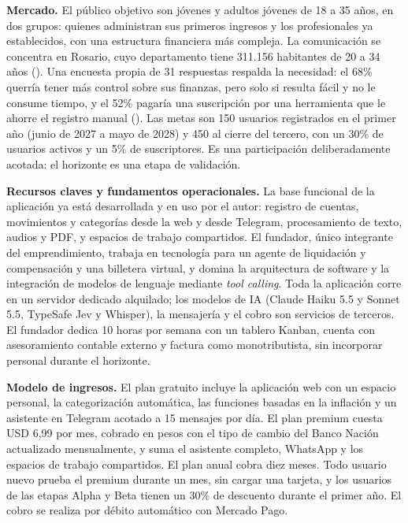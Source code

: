 \textbf{Mercado.} El público objetivo son jóvenes y adultos jóvenes de
18 a 35 años, en dos grupos: quienes administran sus primeros ingresos y
los profesionales ya establecidos, con una estructura financiera más
compleja. La comunicación se concentra en Rosario, cuyo departamento
tiene 311.156 habitantes de 20 a 34 años
(). Una encuesta propia de
31 respuestas respalda la necesidad: el 68\% querría tener más control
sobre sus finanzas, pero solo si resulta fácil y no le consume tiempo, y
el 52\% pagaría una suscripción por una herramienta que le ahorre el
registro manual ().
Las metas son 150 usuarios registrados en el primer año (junio de 2027 a
mayo de 2028) y 450 al cierre del tercero, con un 30\% de usuarios
activos y un 5\% de suscriptores. Es una participación deliberadamente
acotada: el horizonte es una etapa de validación.

\textbf{Recursos claves y fundamentos operacionales.} La base funcional
de la aplicación ya está desarrollada y en uso por el autor: registro de
cuentas, movimientos y categorías desde la web y desde Telegram,
procesamiento de texto, audios y PDF, y espacios de trabajo compartidos.
El fundador, único integrante del emprendimiento, trabaja en tecnología
para un agente de liquidación y compensación y una billetera virtual, y
domina la arquitectura de software y la integración de modelos de
lenguaje mediante \emph{tool calling}. Toda la aplicación corre en un
servidor dedicado alquilado; los modelos de IA (Claude Haiku 5.5 y
Sonnet 5.5, TypeSafe Jev y Whisper), la mensajería y el cobro son
servicios de terceros. El fundador dedica 10 horas por semana con un
tablero Kanban, cuenta con asesoramiento contable externo y factura como
monotributista, sin incorporar personal durante el horizonte.

\textbf{Modelo de ingresos.} El plan gratuito incluye la aplicación web
con un espacio personal, la categorización automática, las funciones
basadas en la inflación y un asistente en Telegram acotado a 15 mensajes
por día. El plan premium cuesta USD 6,99 por mes, cobrado en pesos con
el tipo de cambio del Banco Nación actualizado mensualmente, y suma el
asistente completo, WhatsApp y los espacios de trabajo compartidos. El
plan anual cobra diez meses. Todo usuario nuevo prueba el premium
durante un mes, sin cargar una tarjeta, y los usuarios de las etapas
Alpha y Beta tienen un 30\% de descuento durante el primer año. El cobro
se realiza por débito automático con Mercado Pago.

